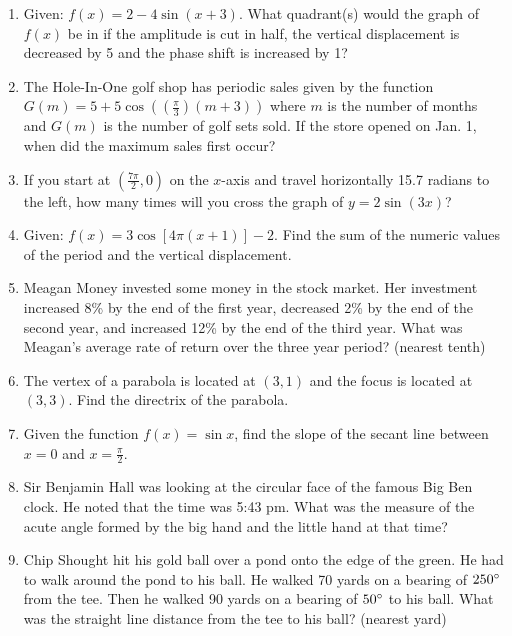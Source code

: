 \documentclass[../uilmath.tex]{subfiles}
\begin{document}
\begin{enumerate}[label=\bfseries\arabic*.]
    \item %
    Given: $f(x)=2-4\sin(x+3)$. What quadrant(s) would the graph of $f(x)$ be in if the amplitude is cut in half, the vertical displacement is decreased by 5 and the phase shift is increased by 1?

    \item %
    The Hole-In-One golf shop has periodic sales given by the function $G(m)=5+5\cos((\frac{\pi}{3})(m+3))$ where $m$ is the number of months 
    and $G(m)$ is the number of golf sets sold. If the store opened on Jan. 1, when did the maximum sales first occur?

    \item %
    If you start at $\left(\frac{7\pi}{2},0\right)$ on the $x$-axis and travel horizontally 15.7 radians to the left, how many times will you cross 
    the graph of $y=2\sin(3x)$?

    \item %
    Given: $f(x)=3\cos[4\pi(x+1)]-2$. Find the sum of the numeric values of the period and the vertical displacement.

    \item %
    Meagan Money invested some money in the stock market. Her investment increased 8\% by the end of the first year,
    decreased 2\% by the end of the second year, and increased 12\% by the end of the third year. What was Meagan's average rate of 
    return over the three year period? (nearest tenth)

    \item %
    The vertex of a parabola is located at $(3,1)$ and the focus is located at $(3,3)$. Find the directrix of the parabola.

    \item %
    Given the function $f(x)=\sin x$, find the slope of the secant line between $x=0$ and $x=\frac{\pi}{2}$.

    \item %
    Sir Benjamin Hall was looking at the circular face of the famous Big Ben clock. He noted that the time was 
    5:43 pm. What was the measure of the acute angle formed by the big hand and the little hand at that time?

    \item %
    Chip Shought hit his gold ball over a pond onto the edge of the green. He had to walk around the pond to his ball. He walked 70 yards on a bearing of 
    $250\degree$ from the tee. Then he walked 90 yards on a bearing of $50\degree$ to his ball. What was the straight line distance from the tee to his ball? (nearest yard)


\end{enumerate}
\end{document}
